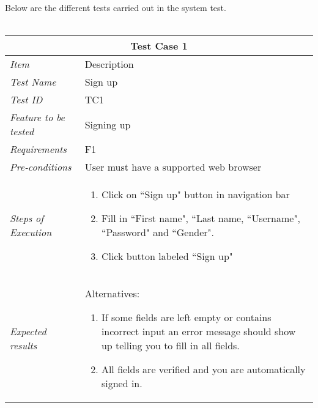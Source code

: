 Below are the different tests carried out in the system test. \\ \\


\begin{minipage}{\linewidth}
\setlength{\tabcolsep}{15pt}
\centering
{}
\begin{tabular}{ |l|p{70mm}| }
	\hline
	\multicolumn{2}{|c|}{\cellcolor{gray!25} \textbf{Test Case 1}} \\
	\hline
	\it{\cellcolor{gray!25}Item} & {\cellcolor{gray!25} Description } \\
	\hline
	\it{\cellcolor{gray!25}Test Name } & Sign up \\ \hline
	\it{\cellcolor{gray!25}Test ID} & TC1 \\ \hline
	\it{\cellcolor{gray!25}Feature to be tested} & Signing up \\ \hline
	\it{\cellcolor{gray!25}Requirements} & F1  \\ \hline
	\it{\cellcolor{gray!25}Pre-conditions} & User must have a supported web browser  \\ \hline
	\it{\cellcolor{gray!25}Steps of Execution} & \begin{enumerate}
	                                       \item Click on ``Sign up" button in navigation bar
	                                       \item Fill in ``First name", ``Last name, ``Username", ``Password" and ``Gender".
	                                       \item Click button labeled ``Sign up"
	                                     \end{enumerate} \\ \hline
	\it{\cellcolor{gray!25}Expected results} & Alternatives: 
	\begin{enumerate}[label=\alph*)]
	                                       \item If some fields are left empty or contains incorrect input an error message should show up telling you to fill in all fields.
	                                       \item All fields are verified and you are automatically signed in.
	                                     \end{enumerate} \\
	\hline
\end{tabular}
\medskip
\end{minipage}
